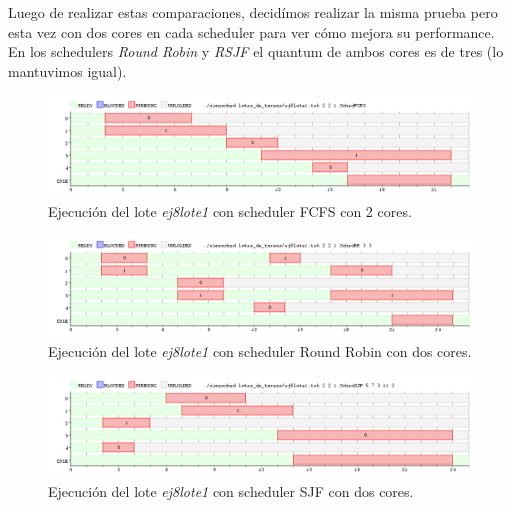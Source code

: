Luego de realizar estas comparaciones, decidímos realizar la misma prueba pero esta vez con dos cores en cada scheduler para ver cómo mejora su performance. En los schedulers \emph{Round Robin} y \emph{RSJF} el quantum de ambos cores es de tres (lo mantuvimos igual).

\begin{figure}[!h]
	\begin{center}
		\includegraphics[width=500px]{imagenes/ej8_prueba1_fcfs2.png}
		\caption{Ejecución del lote \emph{ej8lote1} con scheduler FCFS con 2 cores.}
		\label{fig:grafico_ej8_prueba1_fcfs2}
	\end{center}
\end{figure}

\newpage

\begin{figure}[!h]
	\begin{center}
		\includegraphics[width=500px]{imagenes/ej8_prueba1_rr2.png}
		\caption{Ejecución del lote \emph{ej8lote1} con scheduler Round Robin con dos cores.}
		\label{fig:grafico_ej8_prueba1_rr2}
	\end{center}
\end{figure}

\begin{figure}[!h]
	\begin{center}
		\includegraphics[width=500px]{imagenes/ej8_prueba1_sjf2.png}
		\caption{Ejecución del lote \emph{ej8lote1} con scheduler SJF con dos cores.}
		\label{fig:grafico_ej8_prueba1_sjf2}
	\end{center}
\end{figure}

